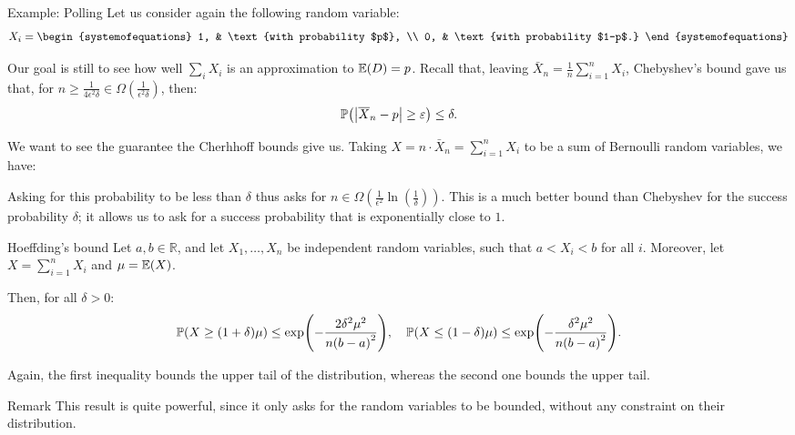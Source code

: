 \documentclass[a4paper]{article}
\begin{document}
\begin{parag}{Example: Polling}
    Let us consider again the following random variable: 
    \[X_i = \begin{systemofequations} 1, & \text{with probability $p$}, \\ 0, & \text{with probability $1-p$.} \end{systemofequations}\]

    Our goal is still to see how well $\sum_{i} X_i$ is an approximation to $\exval\left(D\right) = p$. Recall that, leaving $\bar{X}_n = \frac{1}{n} \sum_{i=1}^{n} X_i$, Chebyshev's bound gave us that, for $n \geq \frac{1}{4 \epsilon^2 \delta} \in \Omega\left(\frac{1}{\epsilon^2 \delta}\right)$, then: 
    \[\prob\left(\left|\bar{X}_n - p\right| \geq \epsilon\right) \leq \delta.\]

    We want to see the guarantee the Cherhhoff bounds give us. Taking $X = n\cdot \bar{X}_n = \sum_{i=1}^{n} X_i$ to be a sum of Bernoulli random variables, we have: 

    Asking for this probability to be less than $\delta$ thus asks for $n \in \Omega\left(\frac{1}{\epsilon^2} \ln\left(\frac{1}{\delta}\right)\right)$. This is a much better bound than Chebyshev for the success probability $\delta$; it allows us to ask for a success probability that is exponentially close to $1$.
\end{parag}

\begin{parag}{Hoeffding's bound}
    Let $a, b \in \mathbb{R}$, and let $X_1, \ldots, X_n$ be independent random variables, such that $a < X_i < b$ for all $i$. Moreover, let $X = \sum_{i=1}^{n} X_i$ and $\mu = \exval\left(X\right)$.

    Then, for all $\delta > 0$: 
    \[\prob\left(X \geq \left(1 + \delta\right) \mu\right) \leq \exp\left(-\frac{2 \delta^2 \mu^2}{n\left(b - a\right)^2}\right), \mathspace \prob\left(X \leq \left(1 - \delta\right) \mu\right) \leq \exp\left(-\frac{\delta^2 \mu^2}{n\left(b-a\right)^2}\right).\]
    
    Again, the first inequality bounds the upper tail of the distribution, whereas the second one bounds the upper tail.

    \begin{subparag}{Remark}
        This result is quite powerful, since it only asks for the random variables to be bounded, without any constraint on their distribution.
    \end{subparag}
\end{parag}
\end{document}
